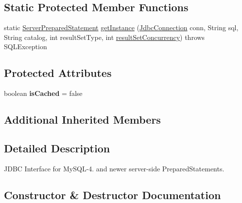 \subsection*{Static Protected Member Functions}
\begin{DoxyCompactItemize}
\item 
static \mbox{\hyperlink{classcom_1_1mysql_1_1cj_1_1jdbc_1_1_server_prepared_statement}{Server\+Prepared\+Statement}} \mbox{\hyperlink{classcom_1_1mysql_1_1cj_1_1jdbc_1_1_server_prepared_statement_a6108da4da92d15f3ed8bc5ceba8c3005}{get\+Instance}} (\mbox{\hyperlink{interfacecom_1_1mysql_1_1cj_1_1jdbc_1_1_jdbc_connection}{Jdbc\+Connection}} conn, String sql, String catalog, int result\+Set\+Type, int \mbox{\hyperlink{classcom_1_1mysql_1_1cj_1_1jdbc_1_1_statement_impl_a8cf4c2416671121707036791a1cd92b7}{result\+Set\+Concurrency}})  throws S\+Q\+L\+Exception 
\end{DoxyCompactItemize}
\subsection*{Protected Attributes}
\begin{DoxyCompactItemize}
\item 
\mbox{\label{classcom_1_1mysql_1_1cj_1_1jdbc_1_1_server_prepared_statement_a8bdf909000acc54403f9d3f32d0ecc73}} 
boolean {\bfseries is\+Cached} = false
\end{DoxyCompactItemize}
\subsection*{Additional Inherited Members}


\subsection{Detailed Description}
J\+D\+BC Interface for My\+S\+Q\+L-\/4. and newer server-\/side Prepared\+Statements. 

\subsection{Constructor \& Destructor Documentation}
\mbox{\label{classcom_1_1mysql_1_1cj_1_1jdbc_1_1_server_prepared_statement_a7ba66017e5f394e2b28838c1bb2509d6}} 

